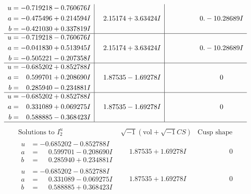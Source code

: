 \documentclass[1p]{elsarticle_modified}
\theoremstyle{definition}
\newcommand{\I}{\sqrt{-1}}
\begin{document}
$$\begin{array}{c|c|c}
\begin{aligned}
u &= -0.719218 - 0.760676 I \\
a &= -0.475496 + 0.214594 I \\
b &= -0.421030 + 0.337819 I\end{aligned}
 & \phantom{-}2.15174 + 3.63424 I & \phantom{-0.000000 } 0. - 10.28689 I \\ \hline\begin{aligned}
u &= -0.719218 - 0.760676 I \\
a &= -0.041830 + 0.513945 I \\
b &= -0.505221 - 0.207358 I\end{aligned}
 & \phantom{-}2.15174 + 3.63424 I & \phantom{-0.000000 } 0. - 10.28689 I \\ \hline\begin{aligned}
u &= -0.685202 + 0.852788 I \\
a &= \phantom{-}0.599701 + 0.208690 I \\
b &= \phantom{-}0.285940 - 0.234881 I\end{aligned}
 & \phantom{-}1.87535 - 1.69278 I & \phantom{-0.000000 } 0 \\ \hline\begin{aligned}
u &= -0.685202 + 0.852788 I \\
a &= \phantom{-}0.331089 + 0.069275 I \\
b &= \phantom{-}0.588885 - 0.368423 I\end{aligned}
 & \phantom{-}1.87535 - 1.69278 I & \phantom{-0.000000 } 0\\
 \hline 
 \end{array}$$\newpage$$\begin{array}{c|c|c}  
\text{Solutions to }I^u_{2}& \I (\text{vol} + \sqrt{-1}CS) & \text{Cusp shape}\\
 \hline 
\begin{aligned}
u &= -0.685202 - 0.852788 I \\
a &= \phantom{-}0.599701 - 0.208690 I \\
b &= \phantom{-}0.285940 + 0.234881 I\end{aligned}
 & \phantom{-}1.87535 + 1.69278 I & \phantom{-0.000000 } 0 \\ \hline\begin{aligned}
u &= -0.685202 - 0.852788 I \\
a &= \phantom{-}0.331089 - 0.069275 I \\
b &= \phantom{-}0.588885 + 0.368423 I\end{aligned}
 & \phantom{-}1.87535 + 1.69278 I & \phantom{-0.000000 } 0 \\ \hline\begin{aligned}

\end{aligned}
\end{array}$$
\end{document}

